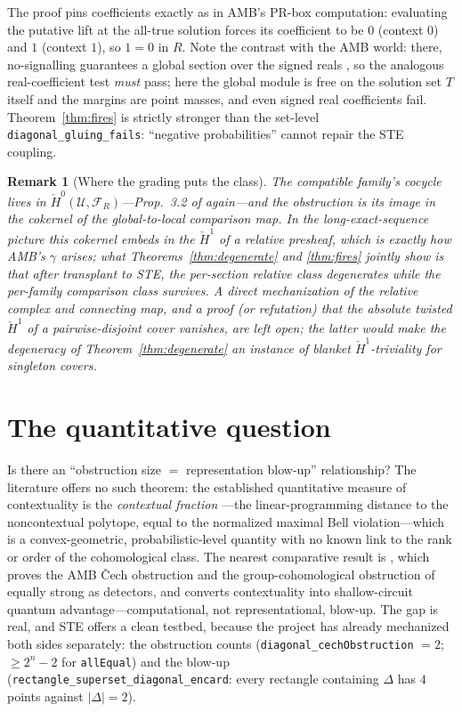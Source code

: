 \documentclass[11pt]{article}
\newtheorem{remark}{Remark}
\newcommand{\lean}[1]{\texttt{#1}}
\newcommand{\cech}{\v{C}ech}
\newcommand{\Hc}[1]{\check{H}^{#1}}
\newcommand{\FR}{\mathcal{F}_R}
\begin{document}
The proof pins coefficients exactly as in AMB's PR-box computation:
evaluating the putative lift at the all-true solution forces its
coefficient to be $0$ (context $0$) and $1$ (context $1$), so $1 = 0$
in $R$.  Note the contrast with the AMB world: there, no-signalling
guarantees a global section over the signed reals
\citep{abramsky2011sheaf}, so the analogous real-coefficient test
\emph{must} pass; here the global module is free on the solution set
$T$ itself and the margins are point masses, and even signed real
coefficients fail.  Theorem~\ref{thm:fires} is strictly stronger than
the set-level \lean{diagonal\_gluing\_fails}: ``negative
probabilities'' cannot repair the STE coupling.

\begin{remark}[Where the grading puts the class]
The compatible family's cocycle lives in
$\Hc{0}(\mathcal{U},\FR)$---Prop.~3.2 of
\citet{abramsky2012cohomology} again---and the obstruction is its
image in the cokernel of the global-to-local comparison map.  In the
long-exact-sequence picture this cokernel embeds in the $\Hc{1}$ of a
relative presheaf, which is exactly how AMB's $\gamma$ arises; what
Theorems~\ref{thm:degenerate} and \ref{thm:fires} jointly show is that
after transplant to STE, the per-\emph{section} relative class
degenerates while the per-\emph{family} comparison class survives.  A
direct mechanization of the relative complex and connecting map, and a
proof (or refutation) that the absolute twisted $\Hc{1}$ of a
pairwise-disjoint cover vanishes, are left open; the latter would make
the degeneracy of Theorem~\ref{thm:degenerate} an instance of blanket
$\Hc{1}$-triviality for singleton covers.
\end{remark}

\section{The quantitative question}
\label{sec:quant}

Is there an ``obstruction size $=$ representation blow-up''
relationship?  The literature offers no such theorem: the established
quantitative measure of contextuality is the \emph{contextual
fraction} \citep{abramsky2017contextualfraction}---the linear-programming
distance to the noncontextual polytope, equal to the normalized maximal
Bell violation---which is a convex-geometric, probabilistic-level
quantity with no known link to the rank or order of the cohomological
class.  The nearest comparative result is \citet{aasnaess2022comparing},
which proves the AMB \cech{} obstruction and the group-cohomological
obstruction of \citet{okay2017topological} equally strong as
detectors, and converts contextuality into shallow-circuit quantum
advantage---computational, not representational, blow-up.  The gap is
real, and STE offers a clean testbed, because the project has already
mechanized both sides separately: the obstruction counts
(\lean{diagonal\_cechObstruction} $=2$;
$\geq 2^n - 2$ for \lean{allEqual}) and the blow-up
(\lean{rectangle\_superset\_diagonal\_encard}: every rectangle
containing $\Delta$ has $4$ points against $|\Delta| = 2$).
\end{document}
